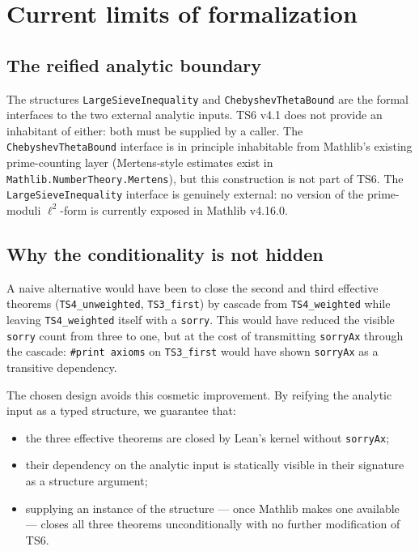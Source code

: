 \documentclass[11pt,a4paper]{article}
\theoremstyle{definition}
\begin{document}
\section{Current limits of formalization}\label{sec:limits}

\subsection{The reified analytic boundary}

The structures \verb|LargeSieveInequality| and \verb|ChebyshevThetaBound| are the formal interfaces to the two external analytic inputs. TS6 v4.1 does not provide an inhabitant of either: both must be supplied by a caller. The \texttt{ChebyshevThetaBound} interface is in principle inhabitable from Mathlib's existing prime-counting layer (Mertens-style estimates exist in \verb|Mathlib.NumberTheory.Mertens|), but this construction is not part of TS6. The \verb|LargeSieveInequality| interface is genuinely external: no version of the prime-moduli $\ell^2$-form is currently exposed in Mathlib v4.16.0.

\subsection{Why the conditionality is not hidden}

A naive alternative would have been to close the second and third effective theorems (\verb|TS4_unweighted|, \verb|TS3_first|) by cascade from \verb|TS4_weighted| while leaving \verb|TS4_weighted| itself with a \texttt{sorry}. This would have reduced the visible \texttt{sorry} count from three to one, but at the cost of transmitting \verb|sorryAx| through the cascade: \verb|#print axioms| on \verb|TS3_first| would have shown \verb|sorryAx| as a transitive dependency.

The chosen design avoids this cosmetic improvement. By reifying the analytic input as a typed structure, we guarantee that:
\begin{itemize}[noitemsep]
\item the three effective theorems are closed by Lean's kernel without \verb|sorryAx|;
\item their dependency on the analytic input is statically visible in their signature as a structure argument;
\item supplying an instance of the structure --- once Mathlib makes one available --- closes all three theorems unconditionally with no further modification of TS6.
\end{itemize}
\end{document}
